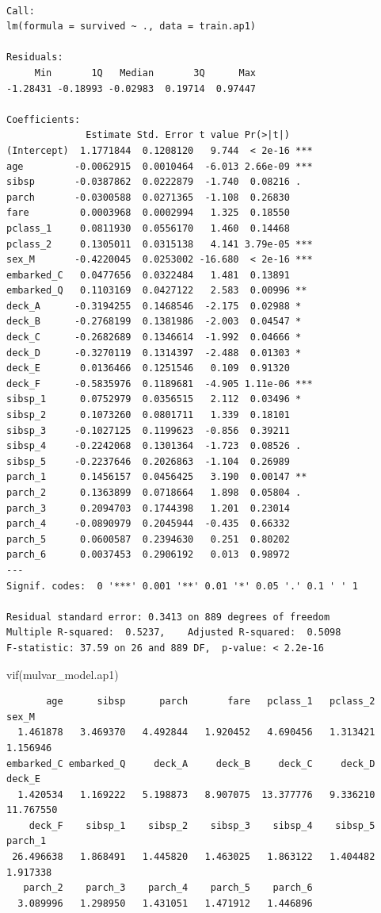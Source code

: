 \documentclass[
  letterpaper,
  DIV=11,
  numbers=noendperiod]{scrartcl}
\newenvironment{Shaded}{\begin{snugshade}}{\end{snugshade}}
\newcommand{\FunctionTok}[1]{\textcolor[rgb]{0.28,0.35,0.67}{#1}}
\newcommand{\NormalTok}[1]{\textcolor[rgb]{0.00,0.23,0.31}{#1}}
\begin{document}
\begin{verbatim}

Call:
lm(formula = survived ~ ., data = train.ap1)

Residuals:
     Min       1Q   Median       3Q      Max 
-1.28431 -0.18993 -0.02983  0.19714  0.97447 

Coefficients:
              Estimate Std. Error t value Pr(>|t|)    
(Intercept)  1.1771844  0.1208120   9.744  < 2e-16 ***
age         -0.0062915  0.0010464  -6.013 2.66e-09 ***
sibsp       -0.0387862  0.0222879  -1.740  0.08216 .  
parch       -0.0300588  0.0271365  -1.108  0.26830    
fare         0.0003968  0.0002994   1.325  0.18550    
pclass_1     0.0811930  0.0556170   1.460  0.14468    
pclass_2     0.1305011  0.0315138   4.141 3.79e-05 ***
sex_M       -0.4220045  0.0253002 -16.680  < 2e-16 ***
embarked_C   0.0477656  0.0322484   1.481  0.13891    
embarked_Q   0.1103169  0.0427122   2.583  0.00996 ** 
deck_A      -0.3194255  0.1468546  -2.175  0.02988 *  
deck_B      -0.2768199  0.1381986  -2.003  0.04547 *  
deck_C      -0.2682689  0.1346614  -1.992  0.04666 *  
deck_D      -0.3270119  0.1314397  -2.488  0.01303 *  
deck_E       0.0136466  0.1251546   0.109  0.91320    
deck_F      -0.5835976  0.1189681  -4.905 1.11e-06 ***
sibsp_1      0.0752979  0.0356515   2.112  0.03496 *  
sibsp_2      0.1073260  0.0801711   1.339  0.18101    
sibsp_3     -0.1027125  0.1199623  -0.856  0.39211    
sibsp_4     -0.2242068  0.1301364  -1.723  0.08526 .  
sibsp_5     -0.2237646  0.2026863  -1.104  0.26989    
parch_1      0.1456157  0.0456425   3.190  0.00147 ** 
parch_2      0.1363899  0.0718664   1.898  0.05804 .  
parch_3      0.2094703  0.1744398   1.201  0.23014    
parch_4     -0.0890979  0.2045944  -0.435  0.66332    
parch_5      0.0600587  0.2394630   0.251  0.80202    
parch_6      0.0037453  0.2906192   0.013  0.98972    
---
Signif. codes:  0 '***' 0.001 '**' 0.01 '*' 0.05 '.' 0.1 ' ' 1

Residual standard error: 0.3413 on 889 degrees of freedom
Multiple R-squared:  0.5237,    Adjusted R-squared:  0.5098 
F-statistic: 37.59 on 26 and 889 DF,  p-value: < 2.2e-16
\end{verbatim}

\begin{Shaded}
\begin{Highlighting}[]
\FunctionTok{vif}\NormalTok{(mulvar\_model.ap1)}
\end{Highlighting}
\end{Shaded}

\begin{verbatim}
       age      sibsp      parch       fare   pclass_1   pclass_2      sex_M 
  1.461878   3.469370   4.492844   1.920452   4.690456   1.313421   1.156946 
embarked_C embarked_Q     deck_A     deck_B     deck_C     deck_D     deck_E 
  1.420534   1.169222   5.198873   8.907075  13.377776   9.336210  11.767550 
    deck_F    sibsp_1    sibsp_2    sibsp_3    sibsp_4    sibsp_5    parch_1 
 26.496638   1.868491   1.445820   1.463025   1.863122   1.404482   1.917338 
   parch_2    parch_3    parch_4    parch_5    parch_6 
  3.089996   1.298950   1.431051   1.471912   1.446896 
\end{verbatim}
\end{document}
